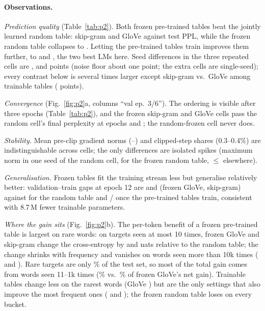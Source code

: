 \documentclass[10pt,a4paper]{article}
\begin{document}
\paragraph{Observations.}
\emph{Prediction quality} (Table~\ref{tab:p2}). Both frozen pre-trained tables beat the jointly learned
random table: skip-gram \pplLSTMSkipFrozen{} and GloVe \pplLSTMGloveFrozen{} against \pplLSTMRand{} test
PPL, while the frozen random table collapses to \pplLSTMRandFrozen. Letting the pre-trained tables train
improves them further, to \pplLSTMSkipTrain{} and \pplLSTMGloveTrain, the two best LMs here. Seed differences in the three repeated cells are \pplSeedDiffLSTMRand, \pplSeedDiffLSTMSkipFrozen{} and \pplSeedDiffLSTMGloveFrozen{} points (noise floor about one point; the extra cells are single-seed); every contrast below is several times larger except skip-gram vs.\ GloVe among trainable tables (\cSkipVsGloveTrain{} points).

\emph{Convergence} (Fig.~\ref{fig:p2}a, columns ``val ep.\ 3/6''). The ordering is visible after three epochs (Table~\ref{tab:p2}), and the frozen skip-gram and GloVe cells pass the random cell's final perplexity at epochs \epochReachLSTMSkipFrozen{} and \epochReachLSTMGloveFrozen; the random-frozen cell never does.

\emph{Stability.} Mean pre-clip gradient norms (\gnMeanLSTMRand--\gnMeanLSTMRandFrozen) and clipped-step shares (0.3--0.4\%) are indistinguishable across cells; the only differences are isolated spikes (maximum norm \gnMaxLSTMRandSeedOne{} in one seed of the random cell, \gnMaxLSTMRandFrozen{} for the frozen random table, $\le$\gnMaxLSTMGloveTrain{} elsewhere).

\emph{Generalisation.} Frozen tables fit the training stream less but generalise relatively better: validation--train gaps at epoch 12 are \gapLSTMGloveFrozen{} and \gapLSTMSkipFrozen{} (frozen GloVe, skip-gram) against \gapLSTMRand{} for the random table and \gapLSTMGloveTrain{}/\gapLSTMSkipTrain{} once the pre-trained tables train, consistent with 8.7\,M fewer trainable parameters.

\emph{Where the gain sits} (Fig.~\ref{fig:p2}b). The per-token benefit of a frozen pre-trained table is largest on rare words: on targets seen at most 10 times, frozen GloVe and skip-gram change the cross-entropy by \dRareLSTMGloveFrozen{} and \dRareLSTMSkipFrozen{} nats relative to the random table; the change shrinks with frequency and vanishes on words seen more than 10k times (\dTopLSTMGloveFrozen{} and \dTopLSTMSkipFrozen). Rare targets are only \fracRare\% of the test set, so most of the total gain comes from words seen 11--1k times (\gainShareMidLSTMGloveFrozen\% vs.\ \gainShareRareLSTMGloveFrozen\% of frozen GloVe's net gain). Trainable tables change less on the rarest words (GloVe \dRareLSTMGloveTrain) but are the only settings that also improve the most frequent ones (\dTopLSTMGloveTrain{} and \dTopLSTMSkipTrain); the frozen random table loses on every bucket.
\end{document}
